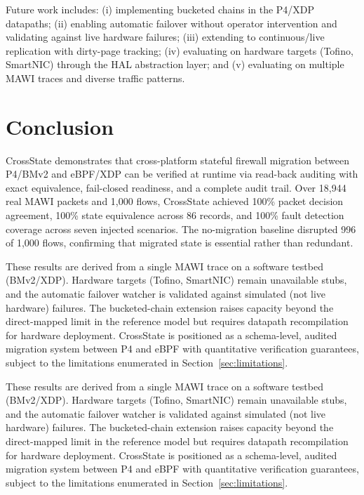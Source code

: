 \documentclass[10pt, conference, compsoc]{IEEEtran}
\begin{document}
Future work includes: (i) implementing bucketed chains in the P4/XDP datapaths;
(ii) enabling automatic failover without operator intervention and validating
against live hardware failures; (iii) extending to continuous/live replication
with dirty-page tracking; (iv) evaluating on hardware targets (Tofino, SmartNIC)
through the HAL abstraction layer; and (v) evaluating on multiple MAWI traces
and diverse traffic patterns.

\section{Conclusion}
\label{sec:conclusion}
CrossState demonstrates that cross-platform stateful firewall migration between
P4/BMv2 and eBPF/XDP can be verified at runtime via read-back auditing with
exact equivalence, fail-closed readiness, and a complete audit trail. Over
18{,}944 real MAWI packets and 1{,}000 flows, CrossState achieved 100\%
packet decision agreement, 100\% state equivalence across 86 records, and
100\% fault detection coverage across seven injected scenarios. The no-migration
baseline disrupted 996 of 1{,}000 flows, confirming that migrated state is
essential rather than redundant.

These results are derived from a single MAWI trace on a software testbed
(BMv2/XDP). Hardware targets (Tofino, SmartNIC) remain unavailable stubs,
and the automatic failover watcher is validated against simulated (not live
hardware) failures. The bucketed-chain extension raises capacity beyond the
direct-mapped limit in the reference model but requires datapath
recompilation for hardware deployment. CrossState is positioned as a
schema-level, audited migration system between P4 and eBPF with quantitative
verification guarantees, subject to the limitations enumerated in
Section~\ref{sec:limitations}.

These results are derived from a single MAWI trace on a software testbed
(BMv2/XDP). Hardware targets (Tofino, SmartNIC) remain unavailable stubs, and
the automatic failover watcher is validated against simulated (not live
hardware) failures. The bucketed-chain extension raises capacity beyond the
direct-mapped limit in the reference model but requires datapath
recompilation for hardware deployment. CrossState is positioned as a
schema-level, audited migration system between P4 and eBPF with quantitative
verification guarantees, subject to the limitations enumerated in
Section~\ref{sec:limitations}.
\end{document}
